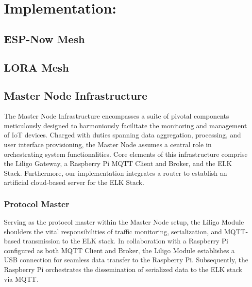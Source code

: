 \section*{Implementation:}\label{sec:implementation}

\subsection{ESP-Now Mesh}\label{sec:espnowmesh}

\subsection{LORA Mesh}\label{sec:loramesh}

\subsection{Master Node Infrastructure}\label{sec:master}

The Master Node Infrastructure encompasses a suite of pivotal components meticulously designed to harmoniously facilitate the monitoring and management of IoT devices. Charged with duties spanning data aggregation, processing, and user interface provisioning, the Master Node assumes a central role in orchestrating system functionalities. Core elements of this infrastructure comprise the Liligo Gateway, a Raspberry Pi MQTT Client and Broker, and the ELK Stack. Furthermore, our implementation integrates a router to establish an artificial cloud-based server for the ELK Stack.

\subsubsection{Protocol Master}\label{sec:protocol}

Serving as the protocol master within the Master Node setup, the Liligo Module shoulders the vital responsibilities of traffic monitoring, serialization, and MQTT-based transmission to the ELK stack. In collaboration with a Raspberry Pi configured as both MQTT Client and Broker, the Liligo Module establishes a USB connection for seamless data transfer to the Raspberry Pi. Subsequently, the Raspberry Pi orchestrates the dissemination of serialized data to the ELK stack via MQTT.

